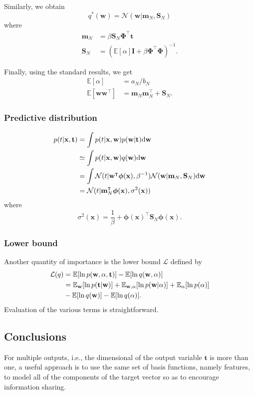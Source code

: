 \documentclass[a4paper]{report}
\newcommand{\ud}{\mathrm{d}}
\renewcommand{\bf}{\mathbf}
\renewcommand{\cal}{\mathcal}
\newcommand{\bb}{\mathbb}
\newcommand{\bs}{\boldsymbol}
\begin{document}
Similarly, we obtain
\begin{equation}
	q^*(\bf{w}) = \cal{N}(\bf{w}|\bf{m}_N,\bf{S}_N)
\end{equation}
where
\begin{align}
	\bf{m}_N &= \beta \bf{S}_N \bs{\Phi}^{\intercal} \bf{t} \\
	\bf{S}_N &= (\bb{E}[\alpha]\bf{I} + \beta \bs{\Phi}^{\intercal} \bs{\Phi})^{-1}.
\end{align}

Finally, using the standard results, we get
\begin{align}
	\bb{E}[\alpha] &= a_N/b_N \\
	\bb{E}[\bf{w}\bf{w}^{\intercal}] &= \bf{m}_N \bf{m}_N^{\intercal} + \bs{S}_N.
\end{align}
\subsubsection{Predictive distribution}
\begin{align}
	p(t|\bf{x,t}) &= \int p(t|\bf{x,w})p(\bf{w|t}) \ud \bf{w} \notag \\
	&\simeq \int p(t|\bf{x,w})q(\bf{w}) \ud \bf{w} \notag\\
	&= \int \cal{N}(t|\bf{w}^{\intercal} \bs{\phi}(\bf{x}),\beta^{-1})\cal{N}(\bf{w}|\bf{m}_N,\bf{S}_N) \ud \bf{w} \notag \\
	&= \cal{N}(t|\bf{m}_N^{\intercal} \bs{\phi}(\bf{x}),\sigma^2(\bf{x}))
\end{align}
where
\begin{equation}
	\sigma^2(\bf{x}) = \frac{1}{\beta} + \bs{\phi}(\bf{x})^{\intercal} \bf{S}_N \bs{\phi}(\bf{x}).
\end{equation}
\subsubsection{Lower bound}
Another quantity of importance is the lower bound $\cal{L}$ defined by
\begin{align}
	\cal{L}(q) &= \bb{E}[\ln p(\bf{w},\alpha,\bf{t})]-\bb{E}[\ln q(\bf{w},\alpha)] \notag\\
	&= \bb{E}_{\bf{w}}[\ln p(\bf{t|w})] + \bb{E}_{\bf{w},\alpha}[\ln p(\bf{w}|\alpha)]+\bb{E}_{\alpha}[\ln p(\alpha)]\notag\\
	&-\bb{E}[\ln q(\bf{w})]-\bb{E}[\ln q(\alpha)].	
\end{align}
Evaluation of the various terms is straightforward.


\subsection{Conclusions}
For multiple outputs, i.e., the dimensional of the output variable $\bf{t}$ is more than one, a useful approach is to use the same set of basis functions, namely features, to model all of the components of the target vector so as to encourage information sharing.
\end{document}
